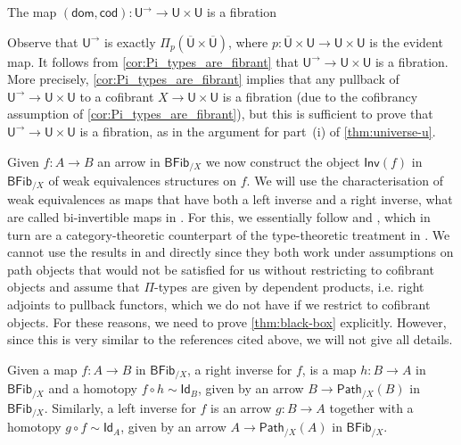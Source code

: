 \documentclass[reqno,10pt,a4paper,oneside,draft]{amsart}
\makeatletter
\renewenvironment{proof}[1][\proofname] {\par\pushQED{\qed}\normalfont\topsep6\p@\@plus6\p@\relax\trivlist\item[\hskip\labelsep\bf#1\@addpunct{.}]\ignorespaces}{\popQED\endtrivlist\@endpefalse}
\numberwithin{equation}{section}
\theoremstyle{mythm}
\theoremstyle{mydef}
\theoremstyle{myrmk}
\newcommand{\ie}{\text{i.e.\ }}
\newcommand{\co}{\colon}
\newcommand{\UU}{\overline{\mathsf{U}}}
\newcommand{\U}{\mathsf{U}}
\newcommand{\Iseq}{\mathsf{Inv}}
\newcommand{\Id}{\mathsf{Id}}
\newcommand{\BFFib}{\mathsf{BFib}}
\newcommand{\Path}{\mathsf{Path}}
\makeatother
\begin{document}
\begin{lemma} The map $(\mathsf{dom}, \mathsf{cod}) \co \U^{\rightarrow} \rightarrow \U \times \U$ is a fibration
\end{lemma}

\begin{proof} Observe that $\U^{\rightarrow}$ is exactly $\Pi_p(\UU \times \UU)$, 
where $p \co \UU \times \U \rightarrow \U \times \U$ is the evident map. 
It follows from \cref{cor:Pi_types_are_fibrant} that $\U^{\rightarrow} \rightarrow \U \times \U$ is a fibration.
More precisely, \cref{cor:Pi_types_are_fibrant} implies that any pullback of  $\U^{\rightarrow} \rightarrow \U \times \U$ to a cofibrant
$X \rightarrow \U \times \U$ is a fibration (due to the cofibrancy assumption of  \cref{cor:Pi_types_are_fibrant}),
but this is sufficient to prove that $\U^{\rightarrow} \rightarrow \U \times \U$ is a fibration,
as in the argument for part~(i) of  \cref{thm:universe-u}.
\end{proof}


Given $f \co A \to B$ an arrow in $\BFFib_{/X}$ we now construct the object $\Iseq(f)$ in $\BFFib_{/X}$ of weak equivalences structures on $f$. We will use the 
characterisation of weak equivalences as maps that have both a left inverse and a right inverse, \ie what are called bi-invertible maps in \cite[Section 4.3]{hottbook}. 
For this, we essentially follow \cite{ShulmanM:unifid} and \cite[Section 1.4]{StenzelR:unirca}, which in turn are a category-theoretic counterpart of the type-theoretic
treatment in \cite{hottbook}. We cannot use the results in \cite{ShulmanM:unifid} and \cite[Section 1.4]{StenzelR:unirca} directly since they both work under 
assumptions on path objects that would not be satisfied for us without restricting to cofibrant objects and assume that $\Pi$-types are given by dependent products, i.e. right adjoints to pullback functors, which we do not have if we restrict to cofibrant objects. For these reasons, we need to prove \cref{thm:black-box} explicitly. However, since this is very similar to the references cited above, we will not give all details.



Given a map $f:A \to B$ in $\BFFib_{/X}$, a right inverse for $f$, is a map $h:B \to A$ in $\BFFib_{/X}$ and a homotopy $f \circ h \sim \Id_B$, given by an arrow $B \to \Path_{/X}(B)$ in $\BFFib_{/X}$. Similarly, a left inverse for $f$ is an arrow $g:B \to A$ together with a homotopy $g \circ f \sim \Id_A$, given by an arrow $A \to \Path_{/X}(A)$ in $\BFFib_{/X}$.
\end{document}
